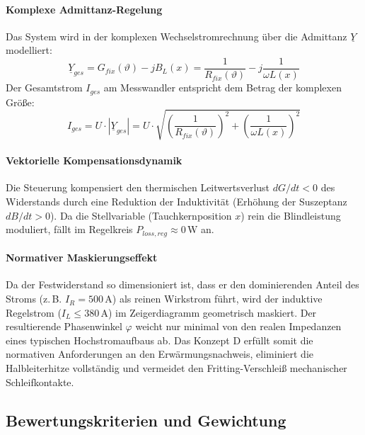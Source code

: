 \paragraph{Komplexe Admittanz-Regelung}
Das System wird in der komplexen Wechselstromrechnung über die Admittanz $\underline{Y}$ modelliert:
\begin{equation}
    \underline{Y}_{ges} = G_{fix}(\vartheta) - j B_L(x) = \frac{1}{R_{fix}(\vartheta)} - j \frac{1}{\omega L(x)}
\end{equation}
Der Gesamtstrom $I_{ges}$ am Messwandler entspricht dem Betrag der komplexen Größe:
\begin{equation}
    I_{ges} = U \cdot |\underline{Y}_{ges}| = U \cdot \sqrt{\left(\frac{1}{R_{fix}(\vartheta)}\right)^2 + \left(\frac{1}{\omega L(x)}\right)^2}
\end{equation}

\paragraph{Vektorielle Kompensationsdynamik}
Die Steuerung kompensiert den thermischen Leitwertsverlust $dG/dt < 0$ des Widerstands durch eine Reduktion der Induktivität (Erhöhung der Suszeptanz $dB/dt > 0$). Da die Stellvariable (Tauchkernposition $x$) rein die Blindleistung moduliert, fällt im Regelkreis $P_{loss,reg} \approx 0\,\text{W}$ an. 

\paragraph{Normativer Maskierungseffekt}
Da der Festwiderstand so dimensioniert ist, dass er den dominierenden Anteil des Stroms (z.\,B. $I_R = 500\,\text{A}$) als reinen Wirkstrom führt, wird der induktive Regelstrom ($I_L \le 380\,\text{A}$) im Zeigerdiagramm geometrisch maskiert. Der resultierende Phasenwinkel $\varphi$ weicht nur minimal von den realen Impedanzen eines typischen Hochstromaufbaus ab. Das Konzept D erfüllt somit die normativen Anforderungen an den Erwärmungsnachweis, eliminiert die Halbleiterhitze vollständig und vermeidet den Fritting-Verschleiß mechanischer Schleifkontakte.


\subsection{Bewertungskriterien und Gewichtung}
\label{sec:bewertungskriterien}

